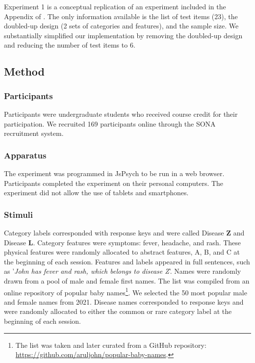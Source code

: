 \documentclass[10pt,letterpaper]{article}
\begin{document}
Experiment 1 is a conceptual replication of an experiment included in the Appendix of .
The only information available is the list of test items (23), the doubled-up design (2 sets of categories and features), and the sample size.
We substantially simplified our implementation by removing the doubled-up design and reducing the number of test items to 6.

\subsection{Method}

\subsubsection{Participants}

Participants were undergraduate students who received course credit for their participation.
We recruited 169 participants online through the SONA recruitment system.

\subsubsection{Apparatus}

The experiment was programmed in JsPsych \cite{deleeuw2015JsPsych} to be run in a web browser.
Participants completed the experiment on their personal computers.
The experiment did not allow the use of tablets and smartphones.

\subsubsection{Stimuli}

Category labels corresponded with response keys and were called Disease \textbf{Z} and Disease \textbf{L}.
Category features were symptoms: fever, headache, and rash.
These physical features were randomly allocated to abstract features, A, B, and C at the beginning of each session.
Features and labels appeared in full sentences, such as '\textit{John has fever and rash, which belongs to disease Z}'.
Names were randomly drawn from a pool of male and female first names.
The list was compiled from an online repository of popular baby names\footnote[1]{The list was taken and later curated from a GitHub repository: \href{https://github.com/aruljohn/popular-baby-names}{https://github.com/aruljohn/popular-baby-names}.}.
We selected the 50 most popular male and female names from 2021.
Disease names corresponded to response keys and were randomly allocated to either the common or rare category label at the beginning of each session.
\end{document}
